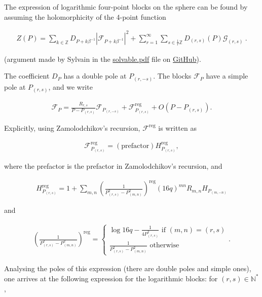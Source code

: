 \documentclass[a4paper]{article}
\numberwithin{equation}{section}
\begin{document}
The expression of logarithmic four-point blocks on the sphere can be found by assuming the holomorphicity of the 4-point function

\begin{align}
 Z(P) = \sum_{k\in\mathbb{Z}} D_{P+k\beta^{-1}} \left|\mathcal{F}_{P+k\beta^{-1}}\right|^2 +\sum_{r=1}^\infty \sum_{s\in\frac{1}{r}\mathbb{Z}} D_{(r,s)}(P) \mathcal{G}_{(r,s)}\ .
\end{align}

(argument made by Sylvain in the \href{file:///Users/Paul/Documents/Cours suivis/Sylvain CFT review/CFT-Review/solvable.pdf}{solvable.pdf} file on \href{https://github.com/ribault/CFT-Review}{GitHub}).

The coefficient \(D_P\) has a double pole at \(P_{(r,-s)}\). The blocks \(\mathcal F_{P}\) have a simple pole at \(P_{(r,s)}\), and we write

\begin{align}
  \mathcal{F}_{P} = \frac{R_{r,s}}{P-P_{(r,s)}} \mathcal{F}_{P_{(r,-s)}} + \mathcal{F}^{\text{reg}}_{P_{(r,s)}} + O(P-P_{(r,s)}).
\end{align}

Explicitly, using Zamolodchikov's recursion, \(\mathcal F^{\text{reg}}\) is written as

\begin{align}
  \mathcal{F}^{\text{reg}}_{P_{(r,s)}} = (\text{prefactor}) H^{\text{reg}}_{P_{(r,s)}},
\end{align}

where the prefactor is the prefactor in Zamolodchikov's recursion, and

\begin{align}
  H^{\text{reg}}_{P_{(r,s)}} = 1 + \sum_{m,n} \left( \frac{1}{P^{2}_{(r,s)} - P^{2}_{(m,n)}} \right)^{\text{reg}} (16q)^{mn} R_{m,n} H_{P_{(m,-n)}}
\end{align}

and

\begin{align}
\left( \frac{1}{P^{2}_{(r,s)} - P^{2}_{(m,n)}} \right)^{\text{reg}} =
\begin{cases}
\log 16q - \frac{1}{4P_{(r,s)}^{2}} \text{  if  } (m,n)=(r,s) \\
\frac{1}{P^{2}_{(r,s)} - P^{2}_{(m,n)}}  \text{  otherwise}
\end{cases}.
\end{align}


Analysing the poles of this expression (there are double poles and simple ones), one arrives at the following expression for the logarithmic blocks: for \((r, s) \in \mathbb{N}^{*}\),
\end{document}

